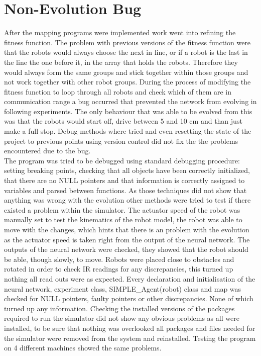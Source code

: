 \section{Non-Evolution Bug}
After the mapping programs were implemented work went into refining the fitness function. 
The problem with previous versions of the fitness function were that the robots would always choose the next in line, or if a robot is the last in the line the one before it, in the array that holds the robots. Therefore they would always form the  same groups and stick together within those groups and not work together with other robot groups.
During the process of modifying the fitness function to loop through all robots and check which of them are in communication range a bug occurred that prevented the network from evolving in following experiments. 
The only behaviour that was able to be evolved from this was that the robots would start off, drive between 5 and 10 cm and than just make a full stop.
Debug methods where tried and even resetting the state of the project to previous points using version control did not fix the the problems encountered due to the bug. \\

The program was tried to be debugged using standard debugging procedure: setting breaking points, checking that all objects have been correctly initialized, that there are no NULL pointers and that information is correctly assigned to variables and parsed between functions.
As those techniques did not show that anything was wrong with the evolution other methods were tried to test if there existed a problem within the simulator.
The actuator speed of the robot was manually set to test the kinematics of the robot model, the robot was able to move with the changes, which hints that there is an problem with the evolution as the actuator speed is taken right from the output of the neural network.
The outputs of the neural network were checked, they showed that the robot should be able, though slowly, to move. 
Robots were placed close to obstacles and rotated in order to check IR readings for any discrepancies, this turned up nothing all read outs were as expected.
Every declaration and initialisation of the neural network, experiment class, SIMPLE\_Agent(robot) class and map was checked for NULL pointers, faulty pointers or other discrepancies. None of which turned up any information.
Checking the installed versions of the packages required to run the simulator did not show any obvious problems as all were installed, to be sure that nothing was overlooked all packages and files needed for the simulator were removed from the system and reinstalled.
Testing the program on 4 different machines showed the same problems. \\

